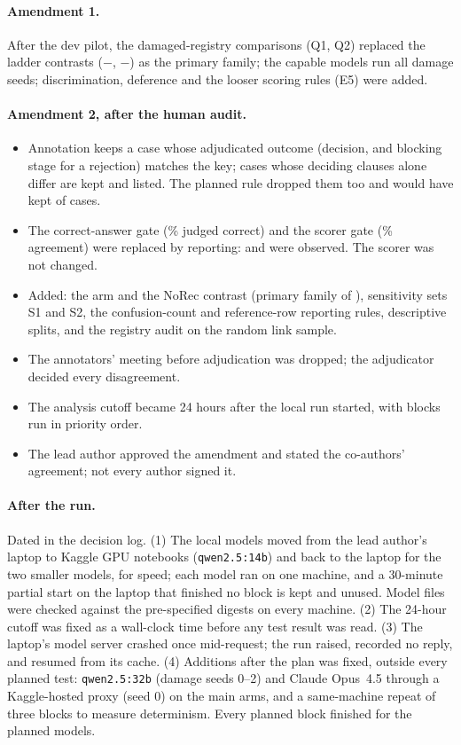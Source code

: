 \paragraph{Amendment 1.} After the dev pilot, the damaged-registry comparisons (Q1, Q2) replaced the ladder
contrasts ($-$, $-$) as the primary family; the capable models run all
\NDamageSeedsCapable{} damage seeds; discrimination, deference and the looser scoring rules (E5) were added.
\paragraph{Amendment 2, after the human audit.}
\begin{itemize}
  \item Annotation keeps a case whose adjudicated outcome (decision, and blocking stage for a rejection) matches the key;
  cases whose deciding clauses alone differ are kept and listed. The planned rule dropped them too and would have
  kept \NStrictKept{} of \NCandidateCases{} cases.
  \item The correct-answer gate (\ControlsGatePct\% judged correct) and the scorer gate (\ScorerCheckPct\% agreement)
  were replaced by reporting: \PctControlsCorrect{} and \ScorerCheckPctObserved{} were observed. The scorer was not
  changed.
  \item Added: the  arm and the NoRec contrast (primary family of \NPrimaryTestsVFive{}), sensitivity sets S1 and
  S2, the confusion-count and reference-row reporting rules, descriptive splits, and the registry audit on the random
  link sample.
  \item The annotators' meeting before adjudication was dropped; the adjudicator decided every disagreement.
  \item The analysis cutoff became 24 hours after the local run started, with blocks run in priority order.
  \item The lead author approved the amendment and stated the co-authors' agreement; not every author signed it.
\end{itemize}
\paragraph{After the run.}
Dated in the decision log. (1) The local models moved from the lead author's laptop to Kaggle GPU notebooks
(\texttt{qwen2.5:14b}) and back to the laptop for the two smaller models, for speed; each model ran on one machine,
and a 30-minute partial start on the laptop that finished no block is kept and unused. Model files were checked
against the pre-specified digests on every machine. (2) The 24-hour cutoff was fixed as a wall-clock time before any
test result was read. (3) The laptop's model server crashed once mid-request; the run raised, recorded no reply, and
resumed from its cache. (4) Additions after the plan was fixed, outside every planned test: \texttt{qwen2.5:32b} (damage seeds 0--2) and Claude
Opus~4.5 through a Kaggle-hosted proxy (seed 0) on the main arms, and a same-machine repeat of three blocks to measure
determinism. Every planned block finished for the planned models.

